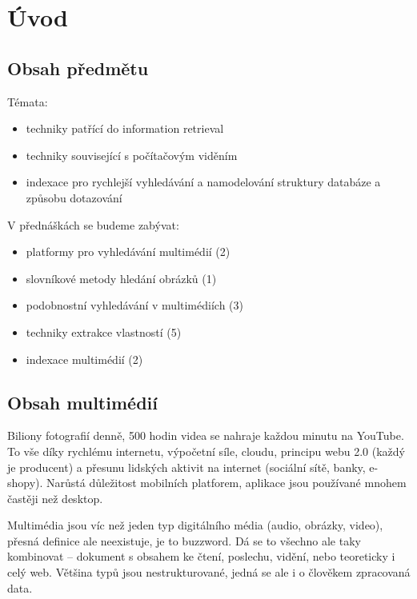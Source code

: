 \section{Úvod}

\vspace{12pt}

\subsection{Obsah předmětu}

Témata:
\begin{itemize}
    \item techniky patřící do information retrieval
    \item techniky související s počítačovým viděním
    \item indexace pro rychlejší vyhledávání a namodelování struktury databáze a způsobu dotazování
\end{itemize}

\noindent V přednáškách se budeme zabývat:
\begin{itemize}
    \item platformy pro vyhledávání multimédií (2)
    \item slovníkové metody hledání obrázků (1)
    \item podobnostní vyhledávání v multimédiích (3)
    \item techniky extrakce vlastností (5)
    \item indexace multimédií (2)
\end{itemize}

\subsection{Obsah multimédií}

Biliony fotografií denně, 500 hodin videa se nahraje každou minutu na YouTube. To vše díky rychlému internetu, výpočetní síle, cloudu, principu webu 2.0 (každý je producent) a přesunu lidských aktivit na internet (sociální sítě, banky, e-shopy). Narůstá důležitost mobilních platforem, aplikace jsou používané mnohem častěji než desktop.

Multimédia jsou víc než jeden typ digitálního média (audio, obrázky, video), přesná definice ale neexistuje, je to buzzword. Dá se to všechno ale taky kombinovat -- dokument s obsahem ke čtení, poslechu, vidění, nebo teoreticky i celý web. Většina typů jsou nestrukturované, jedná se ale i o člověkem zpracovaná data.

